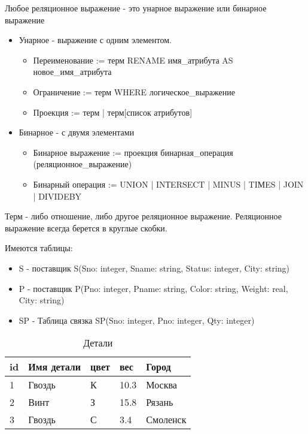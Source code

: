 Любое реляционное выражение - это унарное выражение или бинарное выражение

\begin{itemize}
	\item Унарное - выражение с одним элементом.
	      \begin{itemize}
		      \item Переименование := терм RENAME  имя\_атрибута AS новое\_имя\_атрибута
		      \item Ограничение := терм WHERE логическое\_выражение
		      \item Проекция := терм | терм[список атрибутов]
	      \end{itemize}
	\item Бинарное - с двумя элементами
	      \begin{itemize}
		      \item Бинарное выражение := проекция бинарная\_операция (реляционное\_выражение)
		      \item Бинарный операция := UNION | INТERSECT | MINUS | TIМES | JOIN | DIVIDEBY
	      \end{itemize}
\end{itemize}

Терм - либо отношение, либо другое реляционное выражение.
Реляционное выражение всегда берется в круглые скобки.

Имеются таблицы:
\begin{itemize}
	\item S - поставщик
	      S(Sno: integer, Sname: string, Status: integer, City: string)
	\item P - поставщик
	      P(Pno: integer, Pname: string, Color: string, Weight: real, City: string)
	\item SP - Таблица связка
	      SP(Sno: integer, Pno: integer, Qty: integer)
\end{itemize}

\begin{table}[ht]
	\centering
	\begin{tabular}{ | l | l | l | l |l |}
		\hline
		id & Имя детали & цвет & вес  & Город    \\ \hline
		1  & Гвоздь     & К    & 10.3 & Москва   \\ \hline
		2  & Винт       & З    & 15.8 & Рязань   \\ \hline
		3  & Гвоздь     & С    & 3.4  & Смоленск \\ \hline
		\hline
	\end{tabular}
	\caption{Детали}
	\label{table:ref1}
\end{table}



